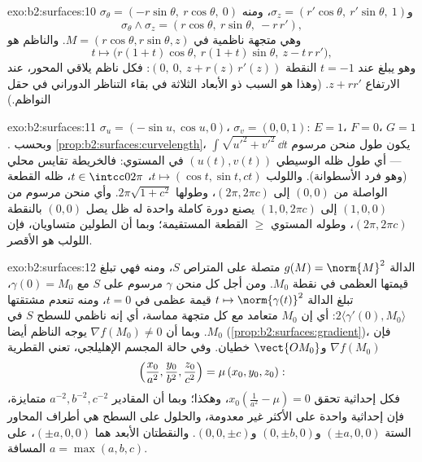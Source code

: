 \begin{solution}{exo:b2:surfaces:10}
$\sigma_\theta = (-r\sin\theta,\ r\cos\theta,\ 0)$ و$\sigma_z = (r'\cos\theta,\ r'\sin\theta,\ 1)$، ومنه
\[
\sigma_\theta \wedge \sigma_z
= (r\cos\theta,\ r\sin\theta,\ -r\,r') ,
\]
وهي متجهة ناظمية في $M = (r\cos\theta, r\sin\theta, z)$. والناظم هو
\[
t \mapsto \bigl(r(1 + t)\cos\theta,\ r(1 + t)\sin\theta,\
z - t\,r\,r'\bigr),
\]
وهو يبلغ عند $t = -1$ النقطة $(0,\ 0,\ z + r(z)\,r'(z))$: فكل ناظم يلاقي المحور، عند
الارتفاع $z + rr'$. (وهذا هو السبب ذو الأبعاد الثلاثة في بقاء التناظر
الدوراني في حقل النواظم.)
\end{solution}

\begin{solution}{exo:b2:surfaces:11}
$\sigma_u = (-\sin u, \cos u, 0)$، $\sigma_v = (0, 0, 1)$: $E
= 1$، $F = 0$، $G = 1$. وبحسب \cref{prop:b2:surfaces:curvelength}، يكون طول
منحن مرسوم $\int\sqrt{u'^2 + v'^2}\,\dd t$ --- أي طول ظله الوسيطي $(u(t), v(t))$ في المستوي: فالخريطة
تقايس محلي (وهو فرد الأسطوانة). واللولب $t \mapsto (\cos t, \sin t, ct)$، $t \in \intcc0{2\pi}$، ظله القطعة
الواصلة من $(0,0)$ إلى $(2\pi, 2\pi c)$، وطولها $2\pi\sqrt{1 + c^2}$. وأي منحن مرسوم من
$(1,0,0)$ إلى $(1,
0, 2\pi c)$ يصنع دورة كاملة واحدة له ظل  يصل $(0, 0)$
بالنقطة $(2\pi, 2\pi c)$، وطوله المستوي $\geq$ القطعة المستقيمة؛ وبما أن
الطولين متساويان، فإن اللولب هو الأقصر.
\end{solution}

\begin{solution}{exo:b2:surfaces:12}
الدالة $g(M) = \norm{M}^2$ متصلة على المتراص $S$، ومنه فهي تبلغ قيمتها
العظمى في نقطة $M_0$. ومن أجل كل منحن $\gamma$ مرسوم على $S$ مع
$\gamma(0) = M_0$، تبلغ الدالة $t
\mapsto \norm{\gamma(t)}^2$ قيمة عظمى في $t = 0$، ومنه تنعدم مشتقتها
$2\langle\gamma'(0), M_0\rangle$: أي إن $M_0$ متعامد مع كل متجهة مماسة، أي إنه ناظمي للسطح
$S$ في $M_0$. وبما أن $\nabla f(M_0) \neq 0$ يوجه الناظم أيضا (\cref{prop:b2:surfaces:gradient})، فإن
$\nabla f(M_0)$ و$\vect{OM_0}$ خطيان. وفي حالة المجسم الإهليلجي، تعني القطرية
\[
\Bigl(\frac{x_0}{a^2}, \frac{y_0}{b^2},
\frac{z_0}{c^2}\Bigr) = \mu\,(x_0, y_0, z_0) :
\]
فكل إحداثية تحقق $x_0(\frac1{a^2} - \mu) = 0$، وهكذا؛ وبما أن المقادير $a^{-2}, b^{-2}, c^{-2}$ متمايزة،
فإن إحداثية واحدة على الأكثر غير معدومة، والحلول على السطح هي أطراف
المحاور الستة $(\pm a, 0, 0)$ و$(0, \pm b, 0)$ و$(0,
0, \pm c)$. والنقطتان الأبعد هما $(\pm a, 0, 0)$،
على المسافة $a = \max(a,b,c)$.
\end{solution}

